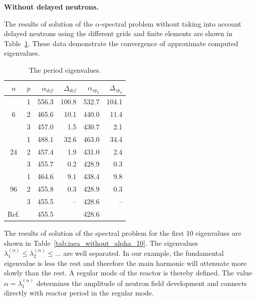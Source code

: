 \documentclass[authoryear]{elsarticle}
\begin{document}
\textbf{Without delayed neutrons.}

The results of solution of the $\alpha$-spectral problem without taking into account delayed neutrons using the different grids and finite elements are shown in Table~\ref{tab:iaea_without_alpha}.
These data demonstrate the convergence of approximate computed eigenvalues.

\begin{table}[h]
\caption{The period eigenvalues.}
\label{tab:iaea_without_alpha}
\begin{center}
\begin{tabular}{c c r r r r}
\hline
$n$ & $p$ & $\alpha_{dif}$ & $\Delta_{dif}$ &$\alpha_{sp_3}$& $\Delta_{sp_3}$ \\
\hline
	& 1	& 556.3 & 100.8 & 532.7 & 104.1\\
6	& 2	& 465.6 & 10.1 & 440.0 & 11.4\\
	& 3	& 457.0 &  1.5 & 430.7 & 2.1\\ 
\hline
	& 1	& 488.1 & 32.6 & 463.0 & 34.4\\
24& 2	& 457.4 & 1.9 & 431.0 & 2.4\\
	& 3	& 455.7 & 0.2 & 428.9 & 0.3\\ 
\hline
	& 1	& 464.6 & 9.1 & 438.4 & 9.8\\
96& 2	& 455.8 & 0.3 & 428.9 & 0.3\\
	& 3	& 455.5 & -- & 428.6 & -- \\ 
\hline
Ref.& & 455.5 & & 428.6 \\ 
\hline
\end{tabular}
\end{center}
\end{table}

The results of solution of the spectral problem for the first 10 eigenvalues are shown in Table~\ref{tab:iaea_without_alpha_10}.
The eigenvalues $\lambda_1^{(\alpha)} \leq \lambda_2^{(\alpha)} \leq ...$ are well separated. 
In our example, the fundamental eigenvalue is less the rest and therefore the main harmonic  will attenuate more slowly than the rest.
A regular mode of the reactor is thereby defined.
The value $\alpha = \lambda_1^{(\alpha)}$ determines the amplitude of neutron field development and connects directly with reactor period in the regular mode.
\end{document}
